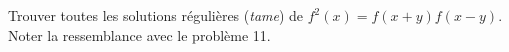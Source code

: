 Trouver toutes les solutions régulières (\emph{tame}) de $f^2(x) = f(x + y)f(x - y)$. Noter la ressemblance avec le problème 11.
